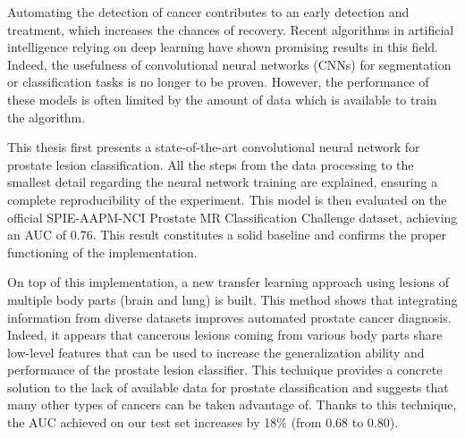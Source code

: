Automating the detection of cancer contributes to an early detection and treatment, which increases the chances of recovery. Recent algorithms in artificial intelligence relying on deep learning have shown promising results in this field. Indeed, the usefulness of convolutional neural networks (CNNs) for segmentation or classification tasks is no longer to be proven. However, the performance of these models is often limited by the amount of data which is available to train the algorithm.

This thesis first presents a state-of-the-art convolutional neural network for pro\-state lesion classification. All the steps from the data processing to the smallest detail regarding the neural network training are explained, ensuring a complete reproducibility of the experiment. This model is then evaluated on the official SPIE-AAPM-NCI Prostate MR Classification Challenge dataset, achieving an AUC of 0.76. This result constitutes a solid baseline and confirms the proper functioning of the implementation.

On top of this implementation, a new transfer learning approach using lesions of multiple body parts (brain and lung) is built. This method shows that integrating information from diverse datasets improves automated prostate cancer diagnosis. Indeed, it appears that cancerous lesions coming from various body parts share low-level features that can be used to increase the generalization ability and performance of the prostate lesion classifier. This technique provides a concrete solution to the lack of available data for prostate classification and suggests that many other types of cancers can be taken advantage of. Thanks to this technique, the AUC achieved on our test set increases by 18\% (from 0.68 to 0.80). 
